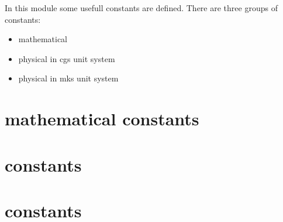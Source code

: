
In this module some usefull constants are defined.
There are three groups of constants:

\begin{itemize}
\item mathematical
\item physical in cgs unit system
\item physical in mks unit system
\end{itemize}

\section{mathematical constants}

\section{\protect{} constants}

\section{\protect{} constants}
